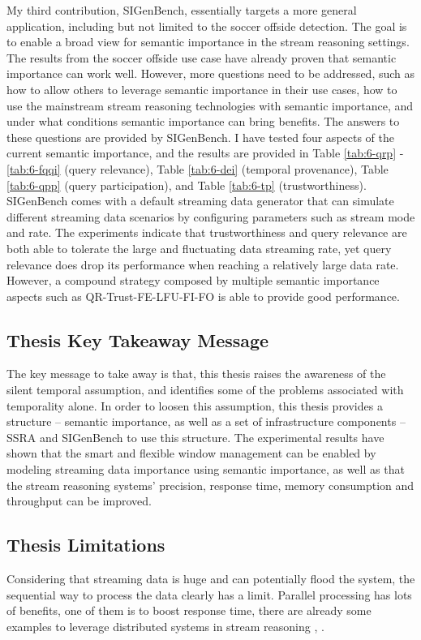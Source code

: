 My third contribution, SIGenBench, essentially targets a more general application, including but not limited to the soccer offside detection. 
The goal is to enable a broad view for semantic importance in the stream reasoning settings. 
The results from the soccer offside use case have already proven that semantic importance can work well. 
However, more questions need to be addressed, such as how to allow others to leverage semantic importance in their use cases, how to use the mainstream stream reasoning technologies with semantic importance, and under what conditions semantic importance can bring benefits. 
The answers to these questions are provided by SIGenBench. 
I have tested four aspects of the current semantic importance, and the results are provided in Table \ref{tab:6-qrp} - \ref{tab:6-fqqi} (query relevance), Table \ref{tab:6-dei} (temporal provenance), Table \ref{tab:6-qpp} (query participation), and Table \ref{tab:6-tp} (trustworthiness). 
SIGenBench comes with a default streaming data generator that can simulate different streaming data scenarios by configuring parameters such as stream mode and rate. 
The experiments indicate that trustworthiness and query relevance are both able to tolerate the large and fluctuating data streaming rate, yet query relevance does drop its performance when reaching a relatively large data rate. 
However, a compound strategy composed by multiple semantic importance aspects such as QR-Trust-FE-LFU-FI-FO is able to provide good performance.
%
\subsection{Thesis Key Takeaway Message}
The key message to take away is that, this thesis raises the awareness of the silent temporal assumption, and identifies some of the problems associated with temporality alone.
In order to loosen this assumption, this thesis provides a structure -- semantic importance, as well as a set of infrastructure components -- SSRA and SIGenBench to use this structure. 
The experimental results have shown that the smart and flexible window management can be enabled by modeling streaming data importance using semantic importance, as well as that the stream reasoning systems' precision, response time, memory consumption and throughput can be improved.
%
\subsection{Thesis Limitations}
Considering that streaming data is huge and can potentially flood the system, the sequential way to process the data clearly has a limit. 
Parallel processing has lots of benefits, one of them is to boost response time, there are already some examples to leverage distributed systems in stream reasoning \cite{hoeksema2011high}, \cite{liu2014efficient}. 

